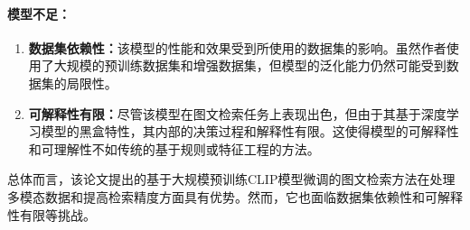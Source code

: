 \documentclass[a4paper]{zreport}
\begin{document}
\paragraph{模型不足：}

\begin{enumerate}
\item \textbf{数据集依赖性：}该模型的性能和效果受到所使用的数据集的影响。虽然作者使用了大规模的预训练数据集和增强数据集，但模型的泛化能力仍然可能受到数据集的局限性。

\item \textbf{可解释性有限：}尽管该模型在图文检索任务上表现出色，但由于其基于深度学习模型的黑盒特性，其内部的决策过程和解释性有限。这使得模型的可解释性和可理解性不如传统的基于规则或特征工程的方法。
\end{enumerate}

\medskip

总体而言，该论文提出的基于大规模预训练CLIP模型微调的图文检索方法在处理多模态数据和提高检索精度方面具有优势。然而，它也面临数据集依赖性和可解释性有限等挑战。


\cite{*}

\newpage




\end{document}
